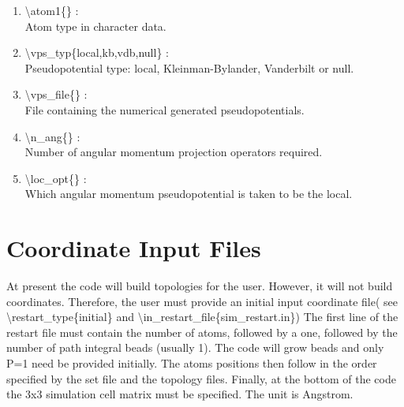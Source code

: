 \documentclass[12pt,titlepage]{article}
\begin{document}
\begin{enumerate}

 \vspace{0.15in} 
 \item  \textbackslash{}atom1\{\} : \\
    Atom type in character data.

 \vspace{0.15in} 
 \item  \textbackslash{}vps\_typ\{local,kb,vdb,null\} : \\
    Pseudopotential type: local, Kleinman-Bylander, Vanderbilt or null.

 \vspace{0.15in} 
 \item  \textbackslash{}vps\_file\{\} : \\
    File containing the numerical generated pseudopotentials.

 \vspace{0.15in} 
 \item  \textbackslash{}n\_ang\{\} : \\
    Number of angular momentum projection operators required.

 \vspace{0.15in} 
 \item  \textbackslash{}loc\_opt\{\} : \\
    Which angular momentum pseudopotential is taken to be the local.

\end{enumerate}

\newpage

\section{\bf Coordinate Input Files} 

At present the code will build topologies for the user. However,
it will not build coordinates. Therefore, the user must provide
an initial input coordinate file( see \textbackslash{}restart\_type\{initial\}
and \textbackslash{}in\_restart\_file\{sim\_restart.in\})
The first line of the restart file must contain the number of atoms,
followed by a one, followed by the number of path integral beads 
(usually 1). The code will grow beads and only P=1 need be provided
initially. The atoms positions then follow in the order specified by
the set file and the topology files. Finally, at the bottom of
the code the 3x3 simulation cell matrix must be specified.
The unit is Angstrom.
\end{document}
